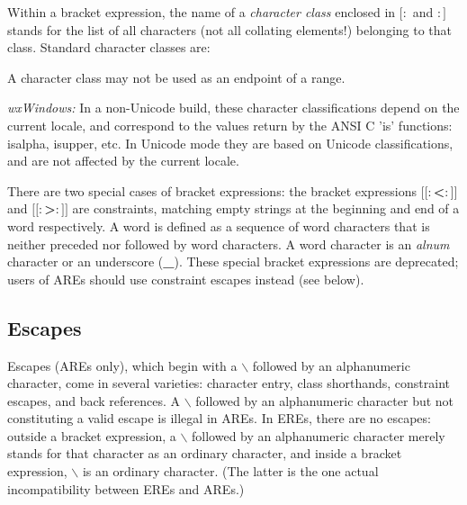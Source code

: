 Within a bracket expression,
the name of a {\it character class} enclosed in {\bf $[:$} and {\bf $:]$} stands for the list
of all characters (not all collating elements!) belonging to that class.
Standard character classes are:

\begin{twocollist}\twocolwidtha{3cm}
\end{twocollist}

A character class may not be used as an endpoint of a range. 

{\it wxWindows:} In a non-Unicode build, these character classifications depend on the
current locale, and correspond to the values return by the ANSI C 'is'
functions: isalpha, isupper, etc. In Unicode mode they are based on
Unicode classifications, and are not affected by the current locale.

There are two special cases of bracket expressions:
the bracket expressions {\bf $[[:$<$:]]$} and {\bf $[[:$>$:]]$} are constraints, matching empty
strings at the beginning and end of a word respectively.  A word is defined
as a sequence of word characters that is neither preceded nor followed
by word characters. A word character is an {\it alnum} character or an underscore
({\bf \_}). These special bracket expressions are deprecated; users of AREs should
use constraint escapes instead (see  below). 


\subsection{Escapes}\label{wxresynescapes}


Escapes (AREs only),
which begin with a {\bf $\backslash$} followed by an alphanumeric character, come in several
varieties: character entry, class shorthands, constraint escapes, and back
references. A {\bf $\backslash$} followed by an alphanumeric character but not constituting
a valid escape is illegal in AREs. In EREs, there are no escapes: outside
a bracket expression, a {\bf $\backslash$} followed by an alphanumeric character merely stands
for that character as an ordinary character, and inside a bracket expression,
 {\bf $\backslash$} is an ordinary character. (The latter is the one actual incompatibility
between EREs and AREs.) 

